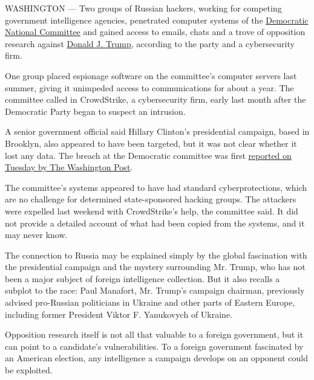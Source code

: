 WASHINGTON --- Two groups of Russian hackers, working for competing
government intelligence agencies, penetrated computer systems of the
\href{http://topics.nytimes.com/top/reference/timestopics/organizations/d/democratic_national_committee/index.html?inline=nyt-org}{Democratic
National Committee} and gained access to emails, chats and a trove of
opposition research against
\href{http://www.nytimes.com/interactive/2016/us/elections/donald-trump-on-the-issues.html?inline=nyt-per}{Donald
J. Trump}, according to the party and a cybersecurity firm.

One group placed espionage software on the committee's computer servers
last summer, giving it unimpeded access to communications for about a
year. The committee called in CrowdStrike, a cybersecurity firm, early
last month after the Democratic Party began to suspect an intrusion.

A senior government official said Hillary Clinton's presidential
campaign, based in Brooklyn, also appeared to have been targeted, but it
was not clear whether it lost any data. The breach at the Democratic
committee was first
\href{https://www.washingtonpost.com/world/national-security/russian-government-hackers-penetrated-dnc-stole-opposition-research-on-trump/2016/06/14/cf006cb4-316e-11e6-8ff7-7b6c1998b7a0_story.html?hpid=hp_hp-banner-main_dnc-hackers-1145a-banner\%3Ahomepage\%2Fstory}{reported
on Tuesday by The Washington Post}.

The committee's systems appeared to have had standard cyberprotections,
which are no challenge for determined state-sponsored hacking groups.
The attackers were expelled last weekend with CrowdStrike's help, the
committee said. It did not provide a detailed account of what had been
copied from the systems, and it may never know.

The connection to Russia may be explained simply by the global
fascination with the presidential campaign and the mystery surrounding
Mr. Trump, who has not been a major subject of foreign intelligence
collection. But it also recalls a subplot to the race: Paul Manafort,
Mr. Trump's campaign chairman, previously advised pro-Russian
politicians in Ukraine and other parts of Eastern Europe, including
former President Viktor F. Yanukovych of Ukraine.

Opposition research itself is not all that valuable to a foreign
government, but it can point to a candidate's vulnerabilities. To a
foreign government fascinated by an American election, any intelligence
a campaign develops on an opponent could be exploited.

